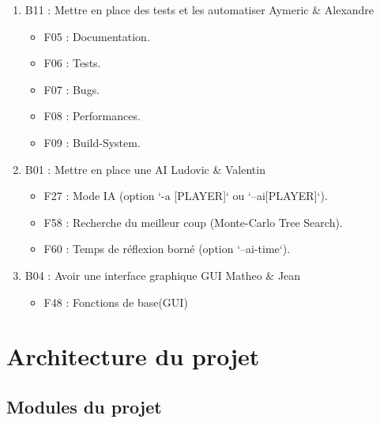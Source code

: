 \documentclass[a4paper,12pt]{article}
\begin{document}
\begin{enumerate}
  \item B11 : Mettre en place des tests et les automatiser\newline
  Aymeric \& Alexandre
  \begin{itemize}
    \item F05 : Documentation.
    \item F06 : Tests.
    \item F07 : Bugs.
    \item F08 : Performances.
    \item F09 : Build-System.
  \end{itemize}
  \item B01 : Mettre en place une AI\newline
  Ludovic \& Valentin
  \begin{itemize}
    \item F27 : Mode IA (option `-a [PLAYER]` ou `--ai[PLAYER]`).
    \item F58 : Recherche du meilleur coup (Monte-Carlo Tree Search).
    \item F60 : Temps de réflexion borné (option `--ai-time`).
  \end{itemize}
  \item B04 : Avoir une interface graphique GUI
  Matheo \& Jean
  \begin{itemize}
    \item F48 : Fonctions de base(GUI)
  \end{itemize}
\end{enumerate}



\section{Architecture du projet}

\subsection{Modules du projet}
\end{document}
